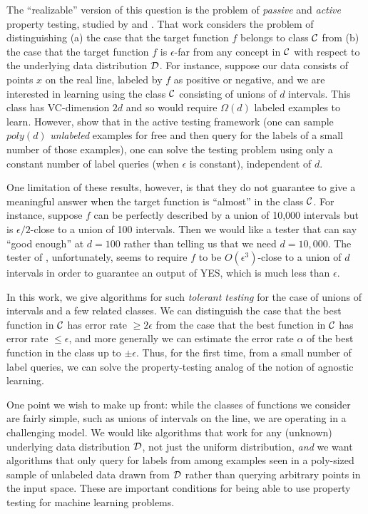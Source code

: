 The ``realizable'' version of this question 
is the problem of {\em passive} and {\em active} property testing, studied by \citet{KR98} and \citet{BBBY12}.  That work considers the problem of distinguishing (a) the case that the target function $f$ belongs to class ${\mathcal{C}}$ from (b) the case that the target function $f$ is $\epsilon$-far from any concept in ${\mathcal{C}}$ with respect to the underlying data distribution ${\mathcal{D}}$.   For instance, suppose our data consists of points $x$ on the real line, labeled by $f$ as positive or negative, and we are interested in learning using the class ${\mathcal{C}}$ consisting of unions of $d$ intervals.  This class has VC-dimension $2d$ and so would require $\Omega(d)$ labeled examples to learn.  However, \citet{BBBY12} show that in the active testing framework (one can sample $poly(d)$ {\em unlabeled} examples for free and then query for the labels of a small number of those examples), one can solve the testing problem using only a constant number of label queries (when $\epsilon$ is constant), independent of $d$.

One limitation of these results, however, is that they do not guarantee to give a meaningful answer when the target function is ``almost'' in the  class ${\mathcal{C}}$.  For instance, suppose $f$ can be perfectly described by a union of 10,000 intervals but is $\epsilon/2$-close to a union of 100 intervals.  Then we would like a tester that can say ``good enough'' at $d=100$ rather than telling us that we need $d=10,000$.  The tester of \citet{BBBY12}, unfortunately, seems to require $f$ to be $O(\epsilon^3)$-close to a union of $d$ intervals in order to guarantee an output of YES, which is much less than $\epsilon$.

In this work, we give algorithms for such {\em tolerant testing} \citep{PRR06} for the case of unions of intervals and a few related classes.  We can distinguish the case that the best function in ${\mathcal{C}}$ has error rate $\geq 2\epsilon$ from the case that the best function in ${\mathcal{C}}$ has error rate $\leq \epsilon$, and more generally we can estimate the error rate $\alpha$ of the best function in the class up to $\pm \epsilon$.  Thus, for the first time, from a small number of label queries, we can solve the property-testing analog of the notion of agnostic learning.

One point we wish to make up front: while the classes of functions we consider are fairly simple, such as unions of intervals on the line, we are operating in a challenging model.  We would like algorithms that work for any (unknown) underlying data distribution ${\mathcal{D}}$, not just the uniform distribution, {\em and} we want algorithms that only query for labels  from among examples seen in a poly-sized sample of unlabeled data drawn from ${\mathcal{D}}$ rather than querying arbitrary points in the input space.  These are important conditions for being able to use property testing for machine learning problems.  

